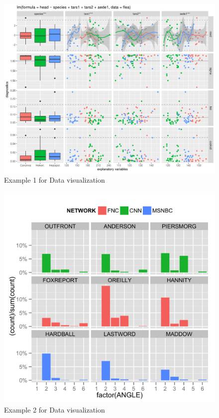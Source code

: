 \documentclass[10pt,journal]{IEEEtran}
\begin{document}
 \begin{figure}[!ht]
    \centering
    \includegraphics[width=0.9\columnwidth]{Fig/data1.png}
    \caption{Example 1 for Data visualization}
 \end{figure}

 \begin{figure}
    \centering
    \includegraphics[width=0.9\columnwidth]{Fig/data2.png}
    \caption{Example 2 for Data visualization}
 \end{figure}
\end{document}
